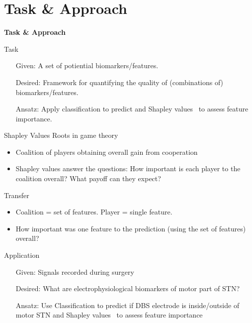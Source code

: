\documentclass[10pt]{beamer}
\begin{document}
\section{Task \& Approach}
\begin{frame}
\begin{center}
 \begin{Huge}
  \textbf{Task \& Approach}
 \end{Huge}
 \end{center}
\end{frame}

\begin{frame}{Task}
  \begin{itemize}
   \item[Given:] A set of potiential biomarkers/features. \\ [3em]
   \item[Desired:] Framework for quantifying the quality of (combinations of) biomarkers/features. \\ [3em]
   \item[Ansatz:] Apply classification to predict and Shapley values~\autocite{shap1} to assess feature importance.
  \end{itemize}
\end{frame}

\begin{frame}{Shapley Values}
Roots in game theory~\autocite{shapley1953value}
\begin{itemize}
 \item Coalition of players obtaining overall gain from cooperation \\ [1em]
 \item Shapley values answer the questions: How important is each player to the coalition overall? What payoff can they expect? \\
 \end{itemize}
 Transfer~\autocite{shap}
 \begin{itemize}
 \item Coalition = set of features. Player = single feature. \\ [2em]
 \item How important was one feature to the prediction (using the set of features) overall?
\end{itemize}
\end{frame}

\begin{frame}{Application}
  \begin{itemize}
   \item[Given:] Signals recorded during surgery \\ [3em]
   \item[Desired:] What are electrophysiological biomarkers of motor part of STN? \\ [3em]
   \item[Ansatz:] Use Classification to predict if DBS electrode is inside/outside of motor STN and Shapley values~\autocite{shap1} to assess feature importance
  \end{itemize}
\end{frame}
\end{document}
